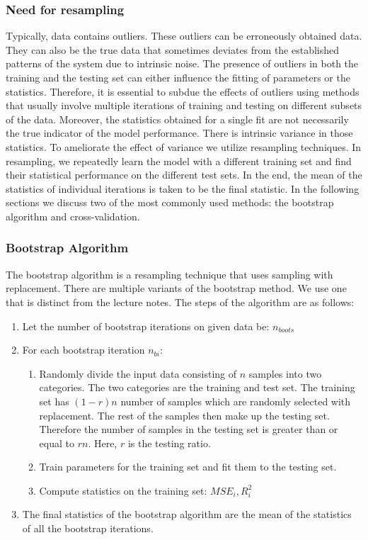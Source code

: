\subsubsection{Need for resampling}
Typically, data contains outliers. These outliers can be erroneously obtained data. They can also be the true data that sometimes deviates from the established patterns of the system due to intrinsic noise. The presence of outliers in both the training and the testing set can either influence the fitting of parameters or the statistics. Therefore, it is essential to subdue the effects of outliers using methods that usually involve multiple iterations of training and testing on different subsets of the data. Moreover, the statistics obtained for a single fit are not necessarily the true indicator of the model performance. There is intrinsic variance in those statistics. To ameliorate the effect of variance we utilize resampling techniques. In resampling, we repeatedly learn the model with a different training set and find their statistical performance on the different test sets. In the end, the mean of the statistics of individual iterations is taken to be the final statistic. \newline \newline In the following sections we discuss two of the most commonly used methods: the bootstrap algorithm and cross-validation. 
\subsubsection{Bootstrap Algorithm}\label{subsubsec:bootstrap}
The bootstrap algorithm is a resampling technique that uses sampling with replacement. There are multiple variants of the bootstrap method. We use one that is distinct from the lecture notes. \newline
The steps of the algorithm are as follows:
\begin{enumerate}
    \item Let the number of bootstrap iterations on given data be: $n_{boots}$
    \item For each bootstrap iteration $n_{bi}$:
    \begin{enumerate}
        \item Randomly divide the input data consisting of $n$ samples into two categories. The two categories are the training and test set. The training set has $(1-r)n$  number of samples which are randomly selected with replacement. The rest of the samples then make up the testing set. Therefore the number of samples in the testing set is greater than or equal to $rn$. Here, $r$ is the testing ratio.
        \item Train parameters for the training set and fit them to the testing set.
        \item Compute statistics on the training set: $MSE_i, R^2_i$
    \end{enumerate}
    \item The final statistics of the bootstrap algorithm are the mean of the statistics of all the bootstrap iterations.
\end{enumerate}

